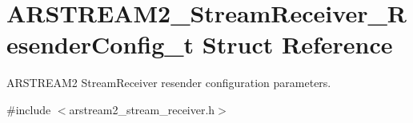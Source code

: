 \hypertarget{struct_a_r_s_t_r_e_a_m2___stream_receiver___resender_config__t}{}\section{A\+R\+S\+T\+R\+E\+A\+M2\+\_\+\+Stream\+Receiver\+\_\+\+Resender\+Config\+\_\+t Struct Reference}
\label{struct_a_r_s_t_r_e_a_m2___stream_receiver___resender_config__t}


A\+R\+S\+T\+R\+E\+A\+M2 Stream\+Receiver resender configuration parameters.  




{\ttfamily \#include $<$arstream2\+\_\+stream\+\_\+receiver.\+h$>$}

